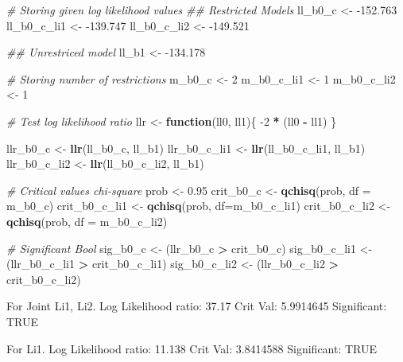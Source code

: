 \documentclass[]{article}
\newenvironment{Shaded}{\begin{snugshade}}{\end{snugshade}}
\newcommand{\CommentTok}[1]{\textcolor[rgb]{0.56,0.35,0.01}{\textit{#1}}}
\newcommand{\ControlFlowTok}[1]{\textcolor[rgb]{0.13,0.29,0.53}{\textbf{#1}}}
\newcommand{\DataTypeTok}[1]{\textcolor[rgb]{0.13,0.29,0.53}{#1}}
\newcommand{\DecValTok}[1]{\textcolor[rgb]{0.00,0.00,0.81}{#1}}
\newcommand{\FloatTok}[1]{\textcolor[rgb]{0.00,0.00,0.81}{#1}}
\newcommand{\KeywordTok}[1]{\textcolor[rgb]{0.13,0.29,0.53}{\textbf{#1}}}
\newcommand{\NormalTok}[1]{#1}
\newcommand{\OperatorTok}[1]{\textcolor[rgb]{0.81,0.36,0.00}{\textbf{#1}}}
\newcommand{\StringTok}[1]{\textcolor[rgb]{0.31,0.60,0.02}{#1}}
\begin{document}
\begin{Shaded}
\begin{Highlighting}[]
\CommentTok{# Storing given log likelihood values}
\CommentTok{## Restricted Models}
\NormalTok{ll_b0_c <-}\StringTok{ }\FloatTok{-152.763}
\NormalTok{ll_b0_c_li1 <-}\StringTok{ }\FloatTok{-139.747}
\NormalTok{ll_b0_c_li2 <-}\StringTok{ }\FloatTok{-149.521}

\CommentTok{## Unrestriced model}
\NormalTok{ll_b1 <-}\StringTok{ }\FloatTok{-134.178}

\CommentTok{# Storing number of restrictions}
\NormalTok{m_b0_c <-}\StringTok{ }\DecValTok{2}
\NormalTok{m_b0_c_li1 <-}\StringTok{ }\DecValTok{1}
\NormalTok{m_b0_c_li2 <-}\StringTok{ }\DecValTok{1}

\CommentTok{# Test log likelihood ratio}
\NormalTok{llr <-}\StringTok{ }\ControlFlowTok{function}\NormalTok{(ll0, ll1)\{}
  \DecValTok{-2} \OperatorTok{*}\StringTok{ }\NormalTok{(ll0 }\OperatorTok{-}\StringTok{ }\NormalTok{ll1)}
\NormalTok{\}}

\NormalTok{llr_b0_c <-}\StringTok{ }\KeywordTok{llr}\NormalTok{(ll_b0_c, ll_b1)}
\NormalTok{llr_b0_c_li1 <-}\StringTok{ }\KeywordTok{llr}\NormalTok{(ll_b0_c_li1, ll_b1)}
\NormalTok{llr_b0_c_li2 <-}\StringTok{ }\KeywordTok{llr}\NormalTok{(ll_b0_c_li2, ll_b1)}

\CommentTok{# Critical values chi-square}
\NormalTok{prob <-}\StringTok{ }\FloatTok{0.95}
\NormalTok{crit_b0_c <-}\StringTok{ }\KeywordTok{qchisq}\NormalTok{(prob, }\DataTypeTok{df =}\NormalTok{ m_b0_c)}
\NormalTok{crit_b0_c_li1 <-}\StringTok{ }\KeywordTok{qchisq}\NormalTok{(prob, }\DataTypeTok{df=}\NormalTok{m_b0_c_li1)}
\NormalTok{crit_b0_c_li2 <-}\StringTok{ }\KeywordTok{qchisq}\NormalTok{(prob, }\DataTypeTok{df =}\NormalTok{ m_b0_c_li2)}

\CommentTok{# Significant Bool}
\NormalTok{sig_b0_c <-}\StringTok{ }\NormalTok{(llr_b0_c }\OperatorTok{>}\StringTok{ }\NormalTok{crit_b0_c)}
\NormalTok{sig_b0_c_li1 <-}\StringTok{ }\NormalTok{(llr_b0_c_li1 }\OperatorTok{>}\StringTok{ }\NormalTok{crit_b0_c_li1)}
\NormalTok{sig_b0_c_li2 <-}\StringTok{ }\NormalTok{(llr_b0_c_li2 }\OperatorTok{>}\StringTok{ }\NormalTok{crit_b0_c_li2)}
\end{Highlighting}
\end{Shaded}

For Joint Li1, Li2. Log Likelihood ratio: 37.17 Crit Val: 5.9914645
Significant: TRUE

For Li1. Log Likelihood ratio: 11.138 Crit Val: 3.8414588 Significant:
TRUE
\end{document}
